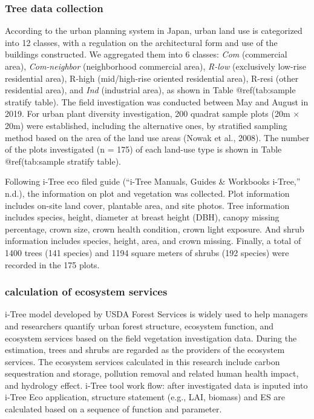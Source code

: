 \documentclass[
]{article}
\begin{document}
\hypertarget{tree-data-collection}{%
\subsubsection{Tree data collection}\label{tree-data-collection}}

According to the urban planning system in Japan, urban land use is categorized into 12 classes, with a regulation on the architectural form and use of the buildings constructed. We aggregated them into 6 classes: \emph{Com} (commercial area), \emph{Com-neighbor} (neighborhood commercial area), \emph{R-low} (exclusively low-rise residential area), R-high (mid/high-rise oriented residential area), R-resi (other residential area), and \emph{Ind} (industrial area), as shown in Table @ref(tab:sample stratify table). The field investigation was conducted between May and August in 2019. For urban plant diversity investigation, 200 quadrat sample plots (20m × 20m) were established, including the alternative ones, by stratified sampling method based on the area of the land use areas (Nowak et al., 2008). The number of the plots investigated (n = 175) of each land-use type is shown in Table @ref(tab:sample stratify table).

Following i-Tree eco filed guide (``i-Tree Manuals, Guides \& Workbooks \textbar{} i-Tree,'' n.d.), the information on plot and vegetation was collected. Plot information includes on-site land cover, plantable area, and site photos. Tree information includes species, height, diameter at breast height (DBH), canopy missing percentage, crown size, crown health condition, crown light exposure. And shrub information includes species, height, area, and crown missing. Finally, a total of 1400 trees (141 species) and 1194 square meters of shrubs (192 species) were recorded in the 175 plots.

\hypertarget{calculation-of-ecosystem-services}{%
\subsubsection{calculation of ecosystem services}\label{calculation-of-ecosystem-services}}

i-Tree model developed by USDA Forest Services is widely used to help managers and researchers quantify urban forest structure, ecosystem function, and ecosystem services based on the field vegetation investigation data. During the estimation, trees and shrubs are regarded as the providers of the ecosystem services. The ecosystem services calculated in this research include carbon sequestration and storage, pollution removal and related human health impact, and hydrology effect.
i-Tree tool work flow: after investigated data is inputed into i-Tree Eco application, structure statement (e.g., LAI, biomass) and ES are calculated based on a sequence of function and parameter.
\end{document}
